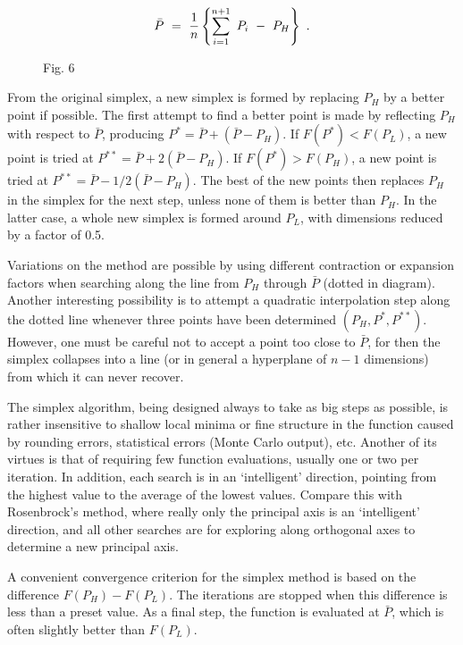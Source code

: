  $$\bar{P}~=~{1\over n}\left\{\sum^{n+1}_{i=1}~P_i~-~P_H\right\}~.$$ 
\begin{figure}[t]
\begin{center}\mbox{}\end{center}
 
\begin{center}
Fig. 6
\end{center}
\end{figure}
\noindent
From the original simplex, a new simplex is formed by replacing $P_H$ by
a better point if possible.  The first attempt to find a better point is
made by reflecting $P_H$ with respect to $\bar{P}$, producing
$P^* = \bar{P} + (\bar{P} - P_H)$.
If $F(P^*) < F(P_L)$, a new point is tried at $P^{**} = \bar{P} + 2(\bar{P} - P_H)$.  If
$F(P^*) > F(P_H)$, a new point is tried at $P^{**} = \bar{P} - 1/2(\bar{P} - P_H)$.  The best of
the new points then replaces $P_H$ in the simplex for the next step, unless
none of them is better than $P_H$. In the latter case, a whole new simplex
is formed around $P_L$, with dimensions reduced by a factor of 0.5.
 
     Variations on the method are possible by using different contraction
or expansion factors when searching along the line from $P_H$ through $\bar{P}$
(dotted in diagram).  Another interesting possibility is to attempt a
quadratic interpolation step along the dotted line whenever three points
have been determined $(P_H, P^*, P^{**})$.  However, one must be careful not to
accept a point too close to $\bar{P}$, for then the simplex collapses into a line
(or in general a hyperplane of $n - 1$ dimensions) from which it can never
recover.
 
     The simplex algorithm, being designed always to take as big steps
as possible, is rather insensitive to shallow local minima or fine
structure in the function caused by rounding errors, statistical errors
(Monte Carlo output), etc.  Another of its virtues is that of requiring
few function evaluations, usually one or two per iteration.  In addition,
each search is in an `intelligent' direction, pointing from the highest
value to the average of the lowest values.  Compare this with Rosenbrock's
method, where really only the principal axis is an `intelligent' direction,
and all other searches are for exploring along orthogonal axes to
determine a new principal axis.
 
     A convenient convergence criterion for the simplex method is based
on the difference $F(P_H) - F(P_L)$.  The iterations are stopped when this
difference is less than a preset value.  As a final step, the function is
evaluated at $\bar{P}$, which is often slightly better than $F(P_L)$.
 
